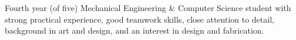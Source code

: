 
\begin{center}
	\begin{minipage}[t]{0.90\textwidth}
		Fourth year (of five) Mechanical Engineering \& Computer Science student with strong practical experience, good teamwork skills, close attention to detail, background in art and design, and an interest in design and fabrication.
	\end{minipage}
\end{center}